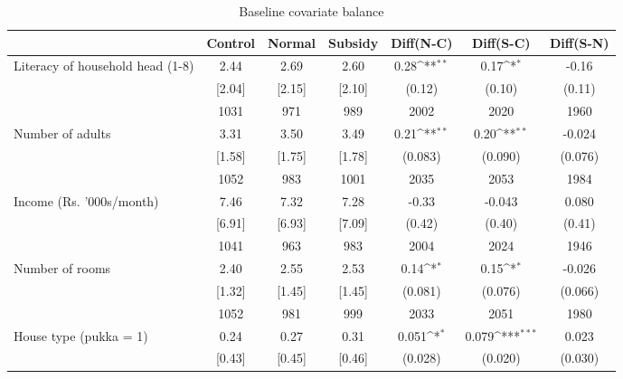 \begin{table}[htbp]\centering
\def\sym#1{\ifmmode^{#1}\else\(^{#1}\)\fi}
\caption{Baseline covariate balance \label{tab:"balance"}}
\begin{tabular*}{1\hsize}{@{\hskip\tabcolsep\extracolsep\fill}l*{1}{cccccc}}
\toprule
                                &  Control&   Normal&  Subsidy&Diff(N-C)         &Diff(S-C)         &Diff(S-N)         \\
\midrule
Literacy of household head (1-8)&     2.44&     2.69&     2.60&     0.28\sym{**} &     0.17\sym{*}  &    -0.16         \\
                                &   [2.04]&   [2.15]&   [2.10]&   (0.12)         &   (0.10)         &   (0.11)         \\
                                &     1031&      971&      989&     2002         &     2020         &     1960         \\
Number of adults                &     3.31&     3.50&     3.49&     0.21\sym{**} &     0.20\sym{**} &   -0.024         \\
                                &   [1.58]&   [1.75]&   [1.78]&  (0.083)         &  (0.090)         &  (0.076)         \\
                                &     1052&      983&     1001&     2035         &     2053         &     1984         \\
Income (Rs. '000s/month)        &     7.46&     7.32&     7.28&    -0.33         &   -0.043         &    0.080         \\
                                &   [6.91]&   [6.93]&   [7.09]&   (0.42)         &   (0.40)         &   (0.41)         \\
                                &     1041&      963&      983&     2004         &     2024         &     1946         \\
Number of rooms                 &     2.40&     2.55&     2.53&     0.14\sym{*}  &     0.15\sym{*}  &   -0.026         \\
                                &   [1.32]&   [1.45]&   [1.45]&  (0.081)         &  (0.076)         &  (0.066)         \\
                                &     1052&      981&      999&     2033         &     2051         &     1980         \\
House type (pukka = 1)          &     0.24&     0.27&     0.31&    0.051\sym{*}  &    0.079\sym{***}&    0.023         \\
                                &   [0.43]&   [0.45]&   [0.46]&  (0.028)         &  (0.020)         &  (0.030)         \\

\end{tabular*}
\end{table}

